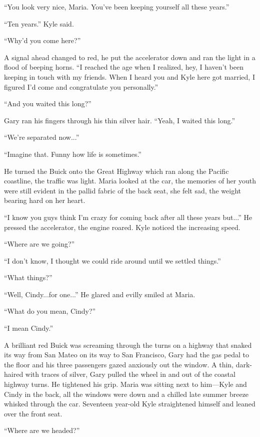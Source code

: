\documentclass[
]{article}
\begin{document}
``You look very nice, Maria. You've been keeping yourself all these
years.''

``Ten years.'' Kyle said.

``Why'd you come here?''

A signal ahead changed to red, he put the accelerator down and ran the
light in a flood of beeping horns. ``I reached the age when I realized,
hey, I haven't been keeping in touch with my friends. When I heard you
and Kyle here got married, I figured I'd come and congratulate you
personally.''

``And you waited this long?''

Gary ran his fingers through his thin silver hair. ``Yeah, I waited this
long.''

``We're separated now...''

``Imagine that. Funny how life is sometimes.''

He turned the Buick onto the Great Highway which ran along the Pacific
coastline, the traffic was light. Maria looked at the car, the memories
of her youth were still evident in the pallid fabric of the back seat,
she felt sad, the weight bearing hard on her heart.

``I know you guys think I'm crazy for coming back after all these years
but...'' He pressed the accelerator, the engine roared. Kyle noticed the
increasing speed.

``Where are we going?''

``I don't know, I thought we could ride around until we settled
things.''

``What things?''

``Well, Cindy...for one...'' He glared and evilly smiled at Maria.

``What do you mean, Cindy?''

``I mean Cindy.''

A brilliant red Buick was screaming through the turns on a highway that
snaked its way from San Mateo on its way to San Francisco, Gary had the
gas pedal to the floor and his three passengers gazed anxiously out the
window. A thin, dark-haired with traces of silver, Gary pulled the wheel
in and out of the coastal highway turns. He tightened his grip. Maria
was sitting next to him---Kyle and Cindy in the back, all the windows
were down and a chilled late summer breeze whisked through the car.
Seventeen year-old Kyle straightened himself and leaned over the front
seat.

``Where are we headed?''
\end{document}
